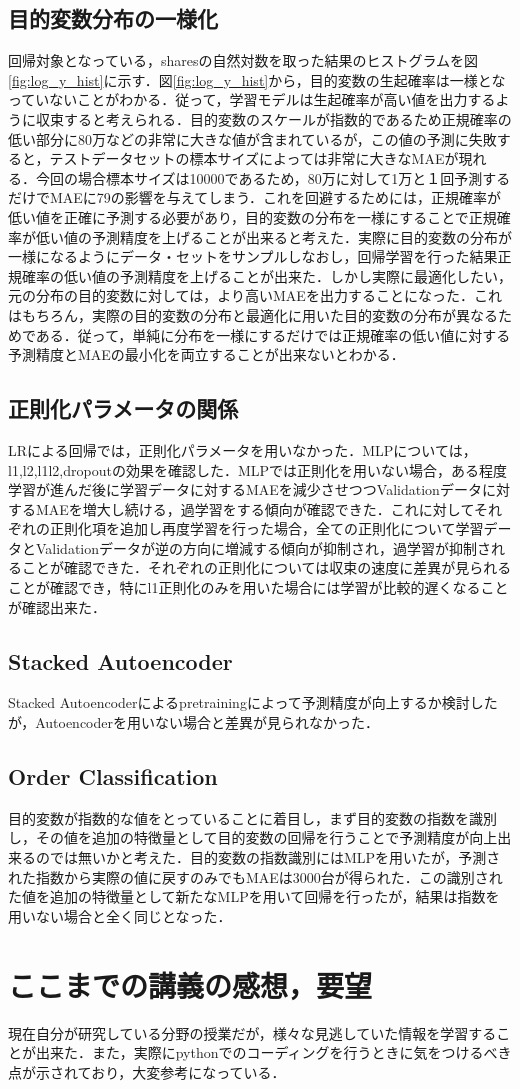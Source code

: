 \subsection{目的変数分布の一様化}
回帰対象となっている，sharesの自然対数を取った結果のヒストグラムを図\ref{fig:log_y_hist}に示す．図\ref{fig:log_y_hist}から，目的変数の生起確率は一様となっていないことがわかる．従って，学習モデルは生起確率が高い値を出力するように収束すると考えられる．目的変数のスケールが指数的であるため正規確率の低い部分に80万などの非常に大きな値が含まれているが，この値の予測に失敗すると，テストデータセットの標本サイズによっては非常に大きなMAEが現れる．今回の場合標本サイズは10000であるため，80万に対して1万と１回予測するだけでMAEに79の影響を与えてしまう．これを回避するためには，正規確率が低い値を正確に予測する必要があり，目的変数の分布を一様にすることで正規確率が低い値の予測精度を上げることが出来ると考えた．実際に目的変数の分布が一様になるようにデータ・セットをサンプルしなおし，回帰学習を行った結果正規確率の低い値の予測精度を上げることが出来た．しかし実際に最適化したい，元の分布の目的変数に対しては，より高いMAEを出力することになった．これはもちろん，実際の目的変数の分布と最適化に用いた目的変数の分布が異なるためである．従って，単純に分布を一様にするだけでは正規確率の低い値に対する予測精度とMAEの最小化を両立することが出来ないとわかる．
\subsection{正則化パラメータの関係}
LRによる回帰では，正則化パラメータを用いなかった．MLPについては，l1,l2,l1l2,dropoutの効果を確認した．MLPでは正則化を用いない場合，ある程度学習が進んだ後に学習データに対するMAEを減少させつつValidationデータに対するMAEを増大し続ける，過学習をする傾向が確認できた．これに対してそれぞれの正則化項を追加し再度学習を行った場合，全ての正則化について学習データとValidationデータが逆の方向に増減する傾向が抑制され，過学習が抑制されることが確認できた．それぞれの正則化については収束の速度に差異が見られることが確認でき，特にl1正則化のみを用いた場合には学習が比較的遅くなることが確認出来た．
\subsection{Stacked Autoencoder}
Stacked Autoencoderによるpretrainingによって予測精度が向上するか検討したが，Autoencoderを用いない場合と差異が見られなかった．
\subsection{Order Classification}
目的変数が指数的な値をとっていることに着目し，まず目的変数の指数を識別し，その値を追加の特徴量として目的変数の回帰を行うことで予測精度が向上出来るのでは無いかと考えた．目的変数の指数識別にはMLPを用いたが，予測された指数から実際の値に戻すのみでもMAEは3000台が得られた．この識別された値を追加の特徴量として新たなMLPを用いて回帰を行ったが，結果は指数を用いない場合と全く同じとなった．
\section{ここまでの講義の感想，要望}
現在自分が研究している分野の授業だが，様々な見逃していた情報を学習することが出来た．また，実際にpythonでのコーディングを行うときに気をつけるべき点が示されており，大変参考になっている．




